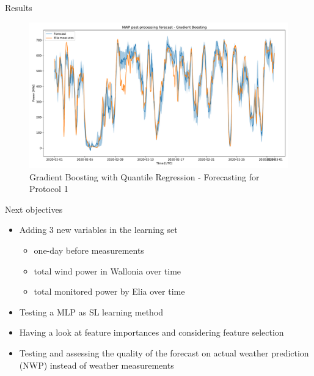 \documentclass[12pt]{beamer}
\begin{document}
\begin{frame}{Results}
    \begin{figure}
        \centering
        \includegraphics[width=\textwidth]{resources/pdf/gradient_boosting_p1.pdf}
        \caption{Gradient Boosting with Quantile Regression - Forecasting for Protocol 1}
        \label{fig:gradient_boosting}
    \end{figure}
\end{frame}

\begin{frame}{Next objectives}
    \begin{itemize}
        \item Adding 3 new variables in the learning set
        \begin{itemize}
            \item one-day before measurements
            \item total wind power in Wallonia \alert{over time}
            \item total monitored power by Elia \alert{over time}
        \end{itemize}
        \item Testing a MLP as SL learning method
        \item Having a look at feature importances and considering feature selection
        \item Testing and assessing the quality of the forecast on actual weather prediction (NWP) instead of weather measurements
    \end{itemize}
\end{frame}

\begin{frame}[allowframebreaks]
    \printbibliography
\end{frame}
\end{document}
